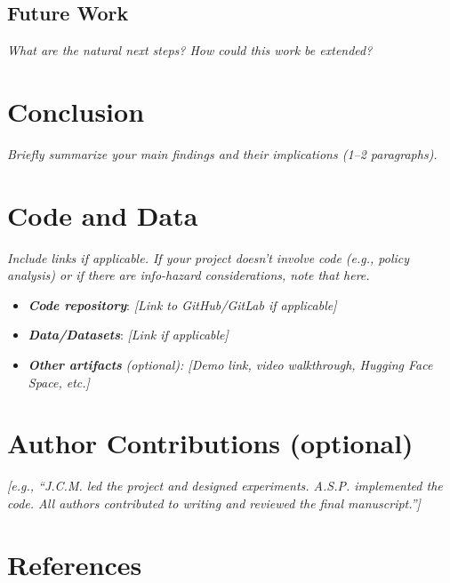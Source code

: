 \documentclass[11pt,letterpaper]{article}
\newcommand{\guide}[1]{\textit{#1}}
\begin{document}
\subsection*{Future Work}

\guide{What are the natural next steps? How could this work be extended?}

\section{Conclusion}

\guide{Briefly summarize your main findings and their implications
(1--2 paragraphs).}

\section*{Code and Data}

\guide{Include links if applicable. If your project doesn't involve code
(e.g., policy analysis) or if there are info-hazard considerations, note that
here.}

\begin{itemize}
  \item \textbf{\textit{Code repository}}: \guide{[Link to GitHub/GitLab if applicable]}
  \item \textbf{\textit{Data/Datasets}}: \guide{[Link if applicable]}
  \item \textbf{\textit{Other artifacts}} \guide{(optional): [Demo link, video
        walkthrough, Hugging Face Space, etc.]}
\end{itemize}

\section*{Author Contributions (optional)}

\guide{[e.g., ``J.C.M. led the project and designed experiments. A.S.P.
implemented the code. All authors contributed to writing and reviewed the final
manuscript.'']}

\section*{References}
\end{document}
